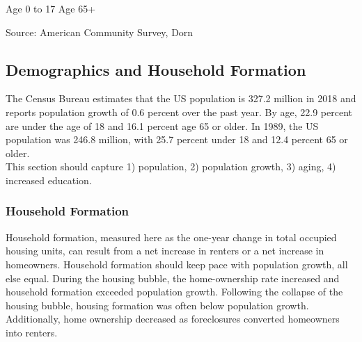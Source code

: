 \documentclass{report}
\begin{document}
{{\hspace{2mm} Age 0 to 17 \hspace{62mm} Age 65+

\vspace{-3mm}
\hspace{-9mm}  \hspace{-3mm} 

\vspace{-3mm}
\footnotesize{Source: American Community Survey, Dorn}


\newpage
\begin{minipage}{0.76\textwidth}

\subsection*{\color{black!70} \seriffont Demographics and Household Formation}

\small The Census Bureau estimates that the US population is 327.2 million in 2018 and reports population growth of 0.6 percent over the past year. By age, 22.9 percent are under the age of 18 and 16.1 percent age 65 or older. In 1989, the US population was 246.8 million, with 25.7 percent under 18 and 12.4 percent 65 or older.\\

This section should capture 1) population, 2) population growth, 3) aging, 4) increased education.\\

\vspace{2mm}

\subsubsection*{\color{black!70} \seriffont Household Formation}

Household formation, measured here as the one-year change in total occupied housing units, can result from a net increase in renters or a net increase in homeowners. Household formation should keep pace with population growth, all else equal. During the housing bubble, the home-ownership rate increased and household formation exceeded population growth. Following the collapse of the housing bubble, housing formation was often below population growth. Additionally, home ownership decreased as foreclosures converted homeowners into renters. \\

\\


\end{minipage}}}
\end{document}
